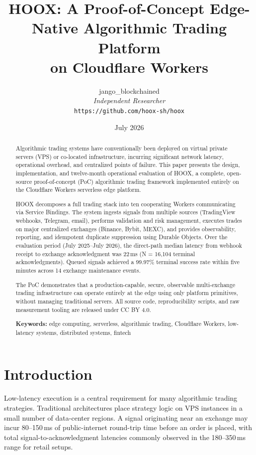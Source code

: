 \documentclass[10pt,a4paper]{article}
\title{\textbf{HOOX: A Proof-of-Concept Edge-Native Algorithmic Trading Platform\\on Cloudflare Workers}}
\author{
  jango\_blockchained\\
  \textit{Independent Researcher}\\
  \texttt{https://github.com/hoox-sh/hoox}
}
\date{July 2026}
\newcommand{\textsc}[1]{\textsf{\small #1}}
\begin{document}
\maketitle

\begin{abstract}
Algorithmic trading systems have conventionally been deployed on virtual private servers (VPS) or co-located infrastructure, incurring significant network latency, operational overhead, and centralized points of failure. This paper presents the design, implementation, and twelve-month operational evaluation of \textsc{HOOX}, a complete, open-source proof-of-concept (PoC) algorithmic trading framework implemented entirely on the Cloudflare Workers serverless edge platform.

\textsc{HOOX} decomposes a full trading stack into ten cooperating Workers communicating via Service Bindings. The system ingests signals from multiple sources (TradingView webhooks, Telegram, email), performs validation and risk management, executes trades on major centralized exchanges (Binance, Bybit, MEXC), and provides observability, reporting, and idempotent duplicate suppression using Durable Objects. Over the evaluation period (July 2025--July 2026), the direct-path median latency from webhook receipt to exchange acknowledgment was 22\,ms (N = 16{,}104 terminal acknowledgments). Queued signals achieved a 99.97\% terminal success rate within five minutes across 14 exchange maintenance events.

The PoC demonstrates that a production-capable, secure, observable multi-exchange trading infrastructure can operate entirely at the edge using only platform primitives, without managing traditional servers. All source code, reproducibility scripts, and raw measurement tooling are released under CC BY 4.0.

\textbf{Keywords:} edge computing, serverless, algorithmic trading, Cloudflare Workers, low-latency systems, distributed systems, fintech
\end{abstract}

\section{Introduction}
\label{sec:intro}

Low-latency execution is a central requirement for many algorithmic trading strategies. Traditional architectures place strategy logic on VPS instances in a small number of data-center regions. A signal originating near an exchange may incur 80--150\,ms of public-internet round-trip time before an order is placed, with total signal-to-acknowledgment latencies commonly observed in the 180--350\,ms range for retail setups.
\end{document}
